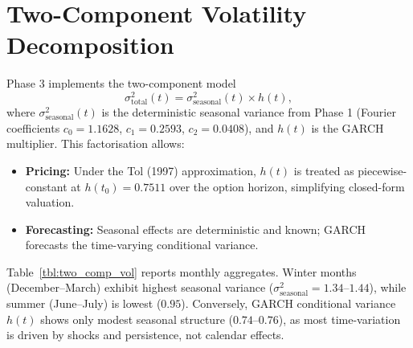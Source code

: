 \documentclass[11pt, a4paper, twoside]{article}
\begin{document}
\section{Two-Component Volatility Decomposition}

Phase 3 implements the two-component model
\begin{equation}
\sigma^2_{\text{total}}(t) = \sigma^2_{\text{seasonal}}(t) \times h(t),
\end{equation}
where $\sigma^2_{\text{seasonal}}(t)$ is the deterministic seasonal variance from Phase 1 (Fourier coefficients $c_0 = 1.1628$, $c_1 = 0.2593$, $c_2 = 0.0408$), and $h(t)$ is the GARCH multiplier. This factorisation allows:
\begin{itemize}
\item \textbf{Pricing:} Under the Tol (1997) approximation, $h(t)$ is treated as piecewise-constant at $h(t_0) = 0.7511$ over the option horizon, simplifying closed-form valuation.
\item \textbf{Forecasting:} Seasonal effects are deterministic and known; GARCH forecasts the time-varying conditional variance.
\end{itemize}

Table~\ref{tbl:two_comp_vol} reports monthly aggregates. Winter months (December--March) exhibit highest seasonal variance ($\sigma^2_{\text{seasonal}} = 1.34$--$1.44$), while summer (June--July) is lowest ($0.95$). Conversely, GARCH conditional variance $h(t)$ shows only modest seasonal structure ($0.74$--$0.76$), as most time-variation is driven by shocks and persistence, not calendar effects.
\end{document}
